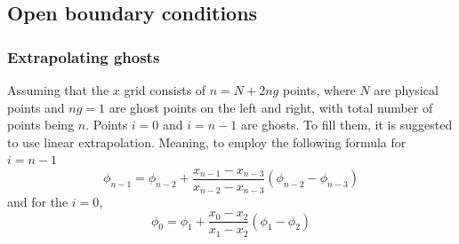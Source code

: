 \documentclass{article}
\begin{document}
\subsection{Open boundary conditions}
\subsubsection{Extrapolating ghosts}
Assuming that the $x$ grid consists of $n=N+2ng$ points, where $N$ are physical points and $ng=1$ are ghost points on the left and right, with total number of points being $n$. Points $i=0$ and $i=n-1$ are ghosts. To fill them, it is suggested to use linear extrapolation. Meaning, to employ the following formula for $i=n-1$
\begin{equation}
	\phi_{n-1} = \phi_{n-2} + \frac{x_{n-1} - x_{n-3}}{x_{n-2} - x_{n-3}}(\phi_{n-2}-\phi_{n-3})
\end{equation}
and for the $i=0$,
\begin{equation}
	\phi_0 = \phi_1 + \frac{x_0-x_2}{x_1 - x_2}(\phi_1 - \phi_2)
\end{equation}
\end{document}
